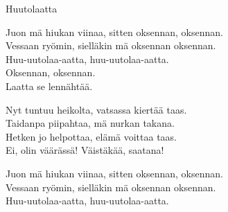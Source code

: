 \begin{song}{Huutolaatta}

    Juon mä hiukan viinaa, sitten oksennan, oksennan.\\
    Vessaan ryömin, sielläkin mä oksennan oksennan.\\
    Huu-uutolaa-aatta, huu-uutolaa-aatta.\\
    Oksennan, oksennan.\\
    Laatta se lennähtää.

    Nyt tuntuu heikolta, vatsassa kiertää taas.\\
    Taidanpa piipahtaa, mä nurkan takana.\\
    Hetken jo helpottaa, elämä voittaa taas.\\
    Ei, olin väärässä! Väistäkää, saatana!

    Juon mä hiukan viinaa, sitten oksennan, oksennan.\\
    Vessaan ryömin, sielläkin mä oksennan oksennan.\\
    Huu-uutolaa-aatta, huu-uutolaa-aatta.\\

\end{song}